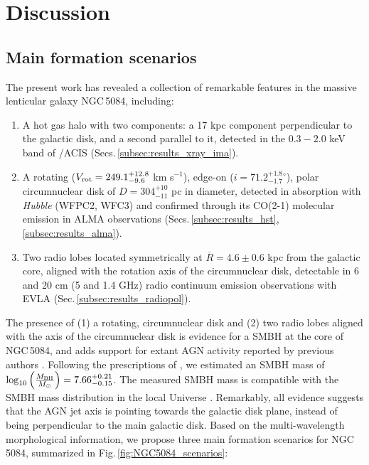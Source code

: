 \documentclass[modern]{CORE-AAS/aastex631}
\begin{document}
\section{Discussion} \label{sec:DIS}
\subsection{Main formation scenarios}
\label{subsec:discussion_main_formation_scenarios}
The present work has revealed a collection of remarkable features in the massive lenticular galaxy NGC\,5084, including: 
\begin{enumerate}

    \item A hot gas halo with two components: a 17 kpc component perpendicular to the galactic disk, and a second parallel to it, detected in the $0.3-2.0$ keV band of \Chandra/ACIS (Secs.\,\ref{subsec:results_xray_ima}). 

    \item A rotating ($V_{\rm rot} = 249.1^{+12.8}_{-9.6}$ km s$^{-1}$), edge-on ($i=71.2^{+1.8}_{-1.7}$$^{\circ}$), polar circumnuclear disk of $D=304^{+10}_{-11}$ pc in diameter, detected in absorption with \emph{Hubble} (WFPC2, WFC3) and confirmed through its CO(2-1) molecular emission in ALMA  observations (Secs.\,\ref{subsec:results_hst}, \,\ref{subsec:results_alma}).
    
    \item Two radio lobes located symmetrically at $\overline{R}=4.6\pm0.6$ kpc from the galactic core, aligned with the rotation axis of the circumnuclear disk, detectable in 6 and 20 cm (5 and 1.4 GHz) radio continuum emission observations with EVLA (Sec.\,\ref{subsec:results_radiopol}).  
    
    
\end{enumerate}
The presence of (1) a rotating, circumnuclear disk and (2) two radio lobes aligned with the axis of the circumnuclear disk is evidence for a SMBH at the core of NGC\,5084, and adds support for extant AGN activity reported by previous authors \citep{kewley+2001apj556_121}. Following the prescriptions of \citet{smith+2021mnras500_1933}, we estimated an SMBH mass of $\log_{10}\left( \frac{M_{\rm BH}}{M_{\odot}} \right) = 7.66^{+0.21}_{-0.15}$. The measured SMBH mass is compatible with the SMBH mass distribution in the local Universe \citep{vika+2009mnras400_1451, smith+2021mnras500_1933}. Remarkably, all evidence suggests that the AGN jet axis is pointing towards the galactic disk plane, instead of being perpendicular to the main galactic disk. Based on the multi-wavelength morphological information, we propose three main formation scenarios for NGC\,5084, summarized in Fig.\,\ref{fig:NGC5084_scenarios}:
\end{document}

